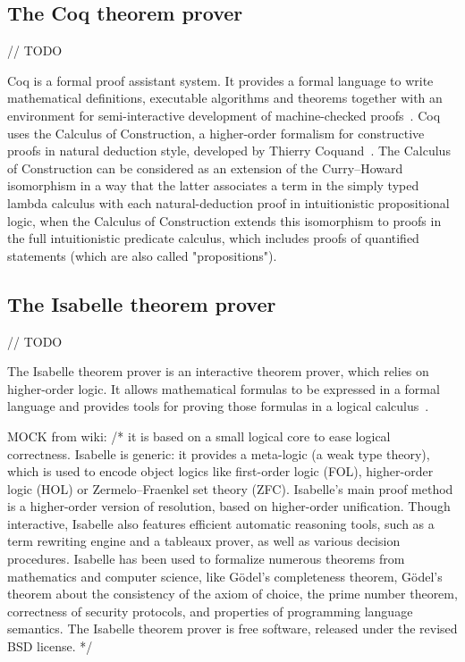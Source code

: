 \documentclass[article]{aaltoseries}
\begin{document}

\subsection{The Coq theorem prover}
\label{sec:prover_coq}

// TODO

Coq is a formal proof assistant system. It provides a formal language to write mathematical definitions, executable algorithms and theorems together with an environment for semi-interactive development of machine-checked proofs~\cite{tool_Coq}. Coq uses the Calculus of Construction, a higher-order formalism for constructive proofs in natural deduction style, developed by Thierry Coquand~\cite{Coq86}. The Calculus of Construction can be considered as an extension of the Curry–Howard isomorphism in a way that the latter associates a term in the simply typed lambda calculus with each natural-deduction proof in intuitionistic propositional logic, when the Calculus of Construction extends this isomorphism to proofs in the full intuitionistic predicate calculus, which includes proofs of quantified statements (which are also called "propositions").


\subsection{The Isabelle theorem prover}
\label{sec:prover_isabelle}

// TODO

The Isabelle theorem prover is an interactive theorem prover, which relies on higher-order logic. It allows mathematical formulas to be expressed in a formal language and provides tools for proving those formulas in a logical calculus~\cite{tool_Isabelle}.

MOCK from wiki:
/* it is based on a small logical core to ease logical correctness. Isabelle is generic: it provides a meta-logic (a weak type theory), which is used to encode object logics like first-order logic (FOL), higher-order logic (HOL) or Zermelo–Fraenkel set theory (ZFC). Isabelle's main proof method is a higher-order version of resolution, based on higher-order unification. Though interactive, Isabelle also features efficient automatic reasoning tools, such as a term rewriting engine and a tableaux prover, as well as various decision procedures.
Isabelle has been used to formalize numerous theorems from mathematics and computer science, like Gödel's completeness theorem, Gödel's theorem about the consistency of the axiom of choice, the prime number theorem, correctness of security protocols, and properties of programming language semantics. The Isabelle theorem prover is free software, released under the revised BSD license.
*/
\end{document}
